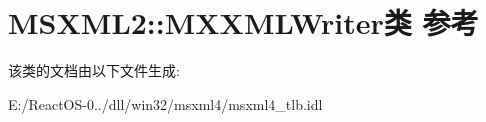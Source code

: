 \hypertarget{class_m_s_x_m_l2_1_1_m_x_x_m_l_writer}{}\section{M\+S\+X\+M\+L2\+:\+:M\+X\+X\+M\+L\+Writer类 参考}
\label{class_m_s_x_m_l2_1_1_m_x_x_m_l_writer}


该类的文档由以下文件生成\+:\begin{DoxyCompactItemize}
\item 
E\+:/\+React\+O\+S-\/0../dll/win32/msxml4/msxml4\+\_\+tlb.\+idl\end{DoxyCompactItemize}
